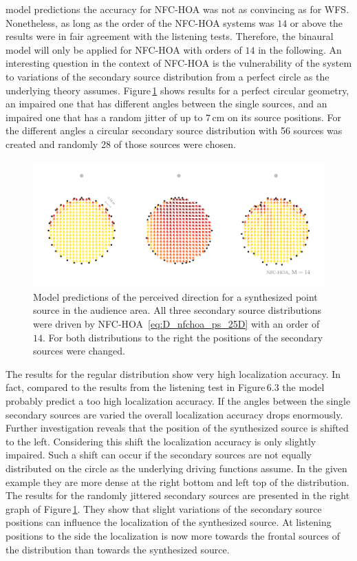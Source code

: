  model predictions the accuracy for \ac{NFC-HOA} was
not as convincing as for \ac{WFS}. Nonetheless, as long as the order of the
\ac{NFC-HOA} systems was $14$ or above the results were in fair agreement with
the listening tests.
Therefore, the binaural model will only be applied for \ac{NFC-HOA} with orders
of $14$ in the following.
An interesting question in the context of \ac{NFC-HOA} is the vulnerability of
the system to variations of the secondary source distribution from a perfect
circle as the underlying theory assumes.
Figure\,\ref{fig:nfchoa_model} shows results for a perfect
circular geometry, an impaired one that has different angles between the single
sources, and an impaired one that has a random jitter of up to $7$\,cm on
its source positions. For the different angles a circular secondary source
distribution with 56 sources was created and randomly 28 of those sources were
chosen.
%
\begin{figure}
    \centering
    \includegraphics{fig6_07/fig6_07}
    \caption{Model predictions of the perceived direction for a synthesized
    point source in the audience area. All three secondary source distributions
    were driven by \ac{NFC-HOA}~\protect\eqref{eq:D_nfchoa_ps_25D} with an order of
    $14$. For both distributions to the right the positions of the secondary
    sources were changed.
    }
    \label{fig:nfchoa_model}
\end{figure}
%
The results for the regular distribution show very high
localization accuracy. In fact, compared to the results from the listening test
in Figure\,6.3 the model probably predict a too
high localization accuracy.
If the angles between the single secondary sources are varied the overall localization
accuracy drops enormously. Further investigation reveals that the position of
the synthesized source is shifted to the left. Considering this shift the
localization accuracy is only slightly impaired. Such a shift can occur if the
secondary sources are not equally distributed on the circle as the underlying
driving functions assume. In the given example they are
more dense at the right bottom and left top of the distribution.
The results for the randomly jittered secondary sources are presented in the
right graph of Figure\,\ref{fig:nfchoa_model}. They show that slight variations
of the secondary source positions can influence the localization of
the synthesized source. At listening positions to the side the localization is
now more towards the frontal sources of the distribution than towards the
synthesized source. 


